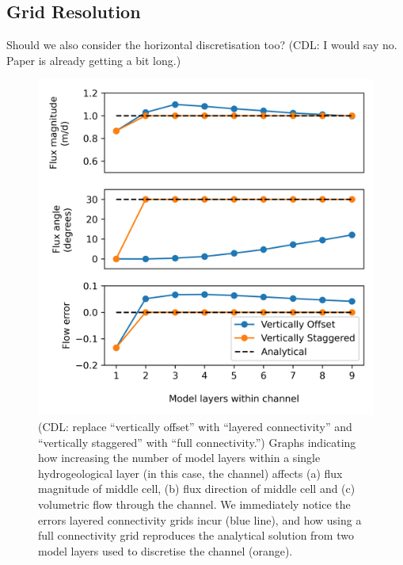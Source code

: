 \documentclass{article}
\begin{document}
\subsection{Grid Resolution}

{\color{red} Should we also consider the horizontal discretisation too? (CDL: I would say no.  Paper is already getting a bit long.)}

\begin{figure}
	\begin{center}
	\includegraphics[scale=0.9]{../figures/fig3paper.png}
	\caption{{\color{red} (CDL: replace ``vertically offset'' with ``layered connectivity'' and ``vertically staggered'' with ``full connectivity.'')} Graphs indicating how increasing the number of model layers within a single hydrogeological layer (in this case, the channel) affects (a) flux magnitude of middle cell, (b) flux direction of middle cell and (c) volumetric flow through the channel. We immediately notice the errors layered connectivity grids incur (blue line), and how using a full connectivity grid reproduces the analytical solution from two model layers used to discretise the channel (orange).}
	\label{fig:fig3}
	\end{center}
\end{figure}
\end{document}

